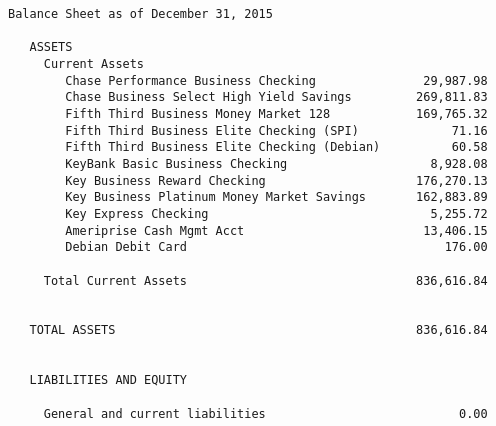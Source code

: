 \documentclass[letterpaper]{report}
\begin{document}
\begin{verbatim}
Balance Sheet as of December 31, 2015

   ASSETS
     Current Assets
        Chase Performance Business Checking               29,987.98
        Chase Business Select High Yield Savings         269,811.83
        Fifth Third Business Money Market 128            169,765.32
        Fifth Third Business Elite Checking (SPI)             71.16
        Fifth Third Business Elite Checking (Debian)          60.58
        KeyBank Basic Business Checking                    8,928.08
        Key Business Reward Checking                     176,270.13
        Key Business Platinum Money Market Savings       162,883.89
        Key Express Checking                               5,255.72
        Ameriprise Cash Mgmt Acct                         13,406.15
        Debian Debit Card                                    176.00

     Total Current Assets                                836,616.84


   TOTAL ASSETS                                          836,616.84


   LIABILITIES AND EQUITY

     General and current liabilities                           0.00


\end{verbatim}
\end{document}
